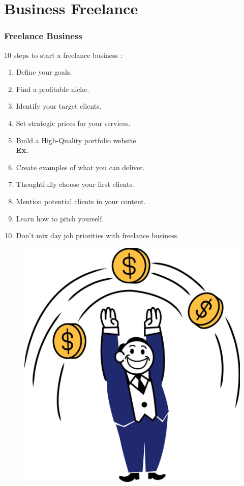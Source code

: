 \section[Business Freelance]{Business Freelance}

\begin{frame}
	\frametitle{Freelance Business}
	10 steps to start a freelance business :
	\begin{minipage}{0.9\linewidth}
	\vspace{0.3cm}
	\fontsize{10}{12}\selectfont
	 \begin{enumerate} \itemsep0em
	    \item Define your goals.
	    \item Find a profitable niche.
	    \item Identify your target clients.
	    \item Set strategic prices for your services.
	    \item Build a High-Quality portfolio website.\\
	    \textbf{Ex.}\href{http://imfreelancer.info/}{}
	    \item Create examples of what you can deliver.
	    \item Thoughtfully choose your first clients.
	    \item Mention potential clients in your content.
	    \item Learn how to pitch yourself.
	    \item Don’t mix day job priorities with freelance business.
	 \end{enumerate}
	 \end{minipage}
	 \hspace{-2.5cm}
	 \begin{minipage}{0.2\linewidth}
	    \begin{figure}
            \includegraphics[scale=0.1]{figures/busniss.jpg}

\end{figure}
\end{minipage}
\end{frame}
